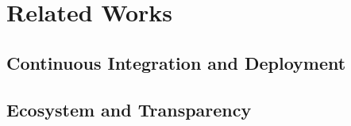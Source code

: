 \section{Related Works}\label{sec:relatedWorks}

\subsection{Continuous Integration and Deployment}


\subsection{Ecosystem and Transparency}